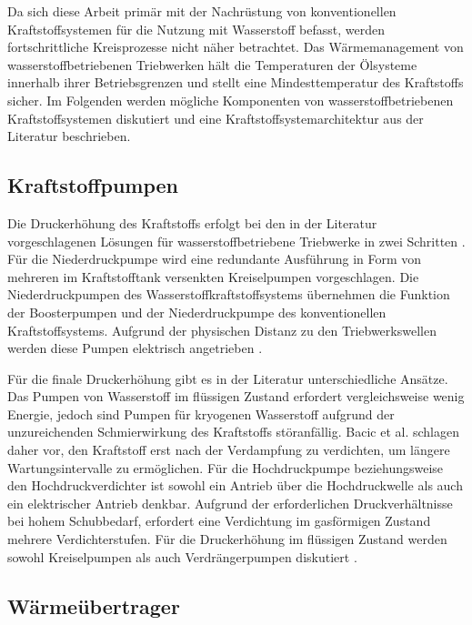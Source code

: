 Da sich diese Arbeit primär mit der Nachrüstung von konventionellen Kraftstoffsystemen für die Nutzung mit Wasserstoff befasst, werden fortschrittliche Kreisprozesse nicht näher betrachtet. Das Wärmemanagement von wasserstoffbetriebenen Triebwerken hält die Temperaturen der Ölsysteme innerhalb ihrer Betriebsgrenzen und stellt eine Mindesttemperatur des Kraftstoffs sicher. Im Folgenden werden mögliche Komponenten von wasserstoffbetriebenen Kraftstoffsystemen diskutiert und eine Kraftstoffsystemarchitektur aus der Literatur beschrieben.

\subsection{Kraftstoffpumpen}

Die Druckerhöhung des Kraftstoffs erfolgt bei den in der Literatur vorgeschlagenen Lösungen für wasserstoffbetriebene Triebwerke in zwei Schritten \cite{Ebrahimi.2024}. Für die Niederdruckpumpe wird eine redundante Ausführung in Form von mehreren im Kraftstofftank versenkten Kreiselpumpen vorgeschlagen. Die Niederdruckpumpen des Wasserstoffkraftstoffsystems übernehmen die Funktion der Boosterpumpen und der Niederdruckpumpe des konventionellen Kraftstoffsystems. Aufgrund der physischen Distanz zu den Triebwerkswellen werden diese Pumpen elektrisch angetrieben \cite{Scholz.2003}. 

Für die finale Druckerhöhung gibt es in der Literatur unterschiedliche Ansätze. Das Pumpen von Wasserstoff im flüssigen Zustand erfordert vergleichsweise wenig Energie, jedoch sind Pumpen für kryogenen Wasserstoff aufgrund der unzureichenden Schmierwirkung des Kraftstoffs störanfällig. Bacic et al. \cite{BacicMarkoCoullJohn.2024} schlagen daher  vor, den Kraftstoff erst nach der Verdampfung zu verdichten, um längere Wartungsintervalle zu ermöglichen. Für die Hochdruckpumpe beziehungsweise den Hochdruckverdichter ist sowohl ein Antrieb  über die Hochdruckwelle als auch ein elektrischer Antrieb denkbar. Aufgrund der erforderlichen Druckverhältnisse bei hohem Schubbedarf, erfordert eine Verdichtung im gasförmigen Zustand mehrere Verdichterstufen. Für die Druckerhöhung im flüssigen Zustand werden sowohl Kreiselpumpen als auch Verdrängerpumpen diskutiert \cite{Scholz.2003, Shaffer.2014}.

\subsection{Wärmeübertrager}

